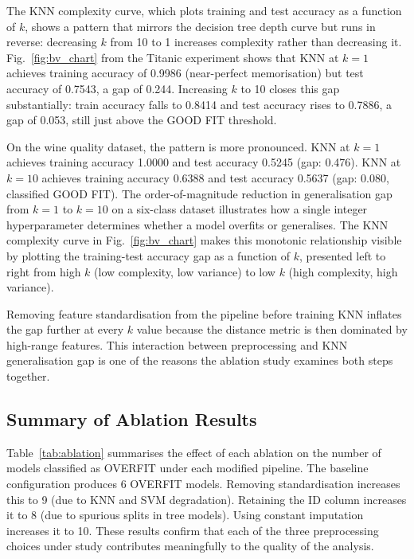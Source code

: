 \documentclass[conference]{IEEEtran}
\begin{document}
The KNN complexity curve, which plots training and test accuracy as a function of $k$, shows a pattern that mirrors the decision tree depth curve but runs in reverse: decreasing $k$ from 10 to 1 increases complexity rather than decreasing it. Fig.~\ref{fig:bv_chart} from the Titanic experiment shows that KNN at $k=1$ achieves training accuracy of 0.9986 (near-perfect memorisation) but test accuracy of 0.7543, a gap of 0.244. Increasing $k$ to 10 closes this gap substantially: train accuracy falls to 0.8414 and test accuracy rises to 0.7886, a gap of 0.053, still just above the GOOD FIT threshold.

On the wine quality dataset, the pattern is more pronounced. KNN at $k=1$ achieves training accuracy 1.0000 and test accuracy 0.5245 (gap: 0.476). KNN at $k=10$ achieves training accuracy 0.6388 and test accuracy 0.5637 (gap: 0.080, classified GOOD FIT). The order-of-magnitude reduction in generalisation gap from $k=1$ to $k=10$ on a six-class dataset illustrates how a single integer hyperparameter determines whether a model overfits or generalises. The KNN complexity curve in Fig.~\ref{fig:bv_chart} makes this monotonic relationship visible by plotting the training-test accuracy gap as a function of $k$, presented left to right from high $k$ (low complexity, low variance) to low $k$ (high complexity, high variance).

Removing feature standardisation from the pipeline before training KNN inflates the gap further at every $k$ value because the distance metric is then dominated by high-range features. This interaction between preprocessing and KNN generalisation gap is one of the reasons the ablation study examines both steps together.

\subsection{Summary of Ablation Results}

Table~\ref{tab:ablation} summarises the effect of each ablation on the number of models classified as OVERFIT under each modified pipeline. The baseline configuration produces 6 OVERFIT models. Removing standardisation increases this to 9 (due to KNN and SVM degradation). Retaining the ID column increases it to 8 (due to spurious splits in tree models). Using constant imputation increases it to 10. These results confirm that each of the three preprocessing choices under study contributes meaningfully to the quality of the analysis.
\end{document}
